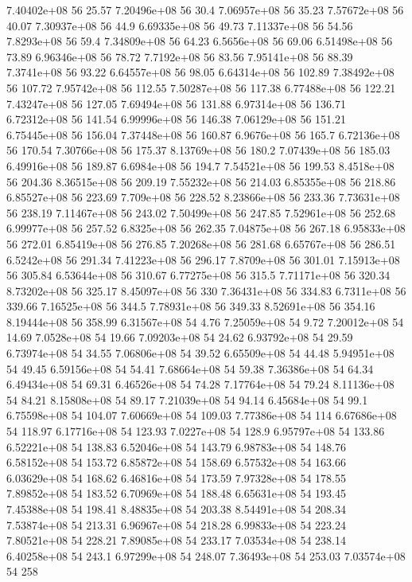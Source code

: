 7.40402e+08 56 25.57
7.20496e+08 56 30.4
7.06957e+08 56 35.23
7.57672e+08 56 40.07
7.30937e+08 56 44.9
6.69335e+08 56 49.73
7.11337e+08 56 54.56
7.8293e+08 56 59.4
7.34809e+08 56 64.23
6.5656e+08 56 69.06
6.51498e+08 56 73.89
6.96346e+08 56 78.72
7.7192e+08 56 83.56
7.95141e+08 56 88.39
7.3741e+08 56 93.22
6.64557e+08 56 98.05
6.64314e+08 56 102.89
7.38492e+08 56 107.72
7.95742e+08 56 112.55
7.50287e+08 56 117.38
6.77488e+08 56 122.21
7.43247e+08 56 127.05
7.69494e+08 56 131.88
6.97314e+08 56 136.71
6.72312e+08 56 141.54
6.99996e+08 56 146.38
7.06129e+08 56 151.21
6.75445e+08 56 156.04
7.37448e+08 56 160.87
6.9676e+08 56 165.7
6.72136e+08 56 170.54
7.30766e+08 56 175.37
8.13769e+08 56 180.2
7.07439e+08 56 185.03
6.49916e+08 56 189.87
6.6984e+08 56 194.7
7.54521e+08 56 199.53
8.4518e+08 56 204.36
8.36515e+08 56 209.19
7.55232e+08 56 214.03
6.85355e+08 56 218.86
6.85527e+08 56 223.69
7.709e+08 56 228.52
8.23866e+08 56 233.36
7.73631e+08 56 238.19
7.11467e+08 56 243.02
7.50499e+08 56 247.85
7.52961e+08 56 252.68
6.99977e+08 56 257.52
6.8325e+08 56 262.35
7.04875e+08 56 267.18
6.95833e+08 56 272.01
6.85419e+08 56 276.85
7.20268e+08 56 281.68
6.65767e+08 56 286.51
6.5242e+08 56 291.34
7.41223e+08 56 296.17
7.8709e+08 56 301.01
7.15913e+08 56 305.84
6.53644e+08 56 310.67
6.77275e+08 56 315.5
7.71171e+08 56 320.34
8.73202e+08 56 325.17
8.45097e+08 56 330
7.36431e+08 56 334.83
6.7311e+08 56 339.66
7.16525e+08 56 344.5
7.78931e+08 56 349.33
8.52691e+08 56 354.16
8.19444e+08 56 358.99
6.31567e+08 54 4.76
7.25059e+08 54 9.72
7.20012e+08 54 14.69
7.0528e+08 54 19.66
7.09203e+08 54 24.62
6.93792e+08 54 29.59
6.73974e+08 54 34.55
7.06806e+08 54 39.52
6.65509e+08 54 44.48
5.94951e+08 54 49.45
6.59156e+08 54 54.41
7.68664e+08 54 59.38
7.36386e+08 54 64.34
6.49434e+08 54 69.31
6.46526e+08 54 74.28
7.17764e+08 54 79.24
8.11136e+08 54 84.21
8.15808e+08 54 89.17
7.21039e+08 54 94.14
6.45684e+08 54 99.1
6.75598e+08 54 104.07
7.60669e+08 54 109.03
7.77386e+08 54 114
6.67686e+08 54 118.97
6.17716e+08 54 123.93
7.0227e+08 54 128.9
6.95797e+08 54 133.86
6.52221e+08 54 138.83
6.52046e+08 54 143.79
6.98783e+08 54 148.76
6.58152e+08 54 153.72
6.85872e+08 54 158.69
6.57532e+08 54 163.66
6.03629e+08 54 168.62
6.46816e+08 54 173.59
7.97328e+08 54 178.55
7.89852e+08 54 183.52
6.70969e+08 54 188.48
6.65631e+08 54 193.45
7.45388e+08 54 198.41
8.48835e+08 54 203.38
8.54491e+08 54 208.34
7.53874e+08 54 213.31
6.96967e+08 54 218.28
6.99833e+08 54 223.24
7.80521e+08 54 228.21
7.89085e+08 54 233.17
7.03534e+08 54 238.14
6.40258e+08 54 243.1
6.97299e+08 54 248.07
7.36493e+08 54 253.03
7.03574e+08 54 258
